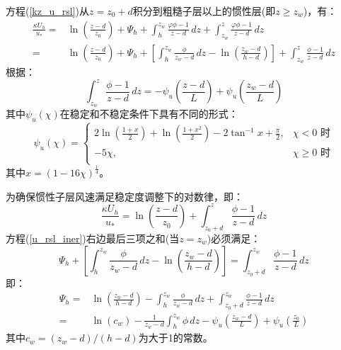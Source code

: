 方程(\ref{kz_u_rsl})从$z=z_0+d$积分到粗糙子层以上的惯性层(即$z\geqslant z_{w}$)，有：
\begin{align}\label{u_rsl_iner}
\frac{\kappa U_{h}}{u_{*}} =& \ln \left(\frac{z-d}{z_{0}}\right) + \Psi_{h} + \int_{h}^{z_{w}} \frac{\varphi \phi - 1}{z-d} \,dz
+ \int_{z_{w}}^{z} \frac{\varphi \phi - 1}{z-d} \,dz \nonumber \\[1ex]
=& \ln \left(\frac{z-d}{z_{0}}\right) + \Psi_{h} + \left[\int_{h}^{z_{w}} \frac{\phi}{z_{w}-d} \,dz - \ln \left(\frac{z_{w}-d}{h-d}\right) \right]
+ \int_{z_{w}}^{z} \frac{\phi - 1}{z-d} \,dz
\end{align}
根据\citet{Garratt1992TheAB}：
\begin{equation}
\int_{z_{w}}^{z} \frac{\phi - 1}{z-d} \,dz = -\psi_u \left(\frac{z-d}{L} \right) + \psi_u \left(\frac{z_{w}-d}{L} \right)
\end{equation}
其中$\psi_u(\chi )$在稳定和不稳定条件下具有不同的形式：
\begin{equation}
   \psi_u(\chi ) = \begin{cases}
      2\ln \left(\frac{1+x}{2} \right) + \ln \left(\frac{1+x^2}{2} \right) - 2\tan^{-1}x + \frac {\pi}{2}, & \chi<0 \text { 时} \\[1ex]
      -5\chi, & \chi \geqslant 0 \text { 时} \\
\end{cases}
\end{equation}
其中$x=(1-16\chi)^{\frac{1}{4}}$。

为确保惯性子层风速满足稳定度调整下的对数律，即：
\begin{equation}\label{u_iner}
\frac{\kappa U_{h}}{u_{*}} = \ln \left(\frac{z-d}{z_{0}}\right) + \int_{z_{0}+d}^{z} \frac{\phi - 1}{z-d} \,dz
\end{equation}
方程(\ref{u_rsl_iner})右边最后三项之和(当$z=z_{w}$)必须满足：
\begin{equation}
\Psi_{h} + \left[\int_{h}^{z_{w}} \frac{\phi}{z_{w}-d} \,dz - \ln \left(\frac{z_{w}-d}{h-d}\right) \right] = \int_{z_{0}+d}^{z_{w}} \frac{\phi - 1}{z-d} \,dz
\end{equation}
即：
\begin{align}\label{Psih_general}
\Psi_{h} =& \ln \left(\frac{z_{w}-d}{h-d}\right) - \int_{h}^{z_{w}} \frac{\phi}{z_{w}-d} \,dz
+ \int_{z_{0}+d}^{z_{w}} \frac{\phi - 1}{z-d} \,dz \nonumber \\[1.5ex]
=& \ln \left(c_{w}\right) -\frac{1}{z_{w}-d} \int_{h}^{z_{w}} \phi \,dz - \psi_u \left(\frac{z_{w}-d}{L} \right)
+ \psi_u \left(\frac{z_{0}}{L} \right)
\end{align}
其中$c_{w}=(z_{w}-d)/(h-d)$为大于1的常数。

